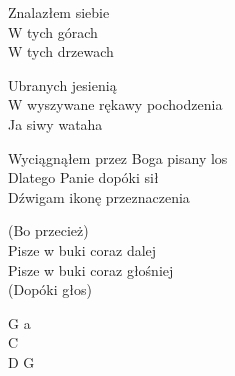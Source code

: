 \begin{text}
    Znalazłem siebie\\
    W tych górach\\
    W tych drzewach

    Ubranych jesienią\\
    W wyszywane rękawy  pochodzenia\\
    Ja siwy wataha

    Wyciągnąłem przez Boga pisany los\\
    Dlatego Panie dopóki sił\\
    Dźwigam ikonę przeznaczenia

    (Bo przecież)\\
    Pisze w buki coraz dalej\\
    Pisze w buki coraz głośniej\\
    (Dopóki głos)
\end{text}
\begin{chord}
    G a\\
    C\\
    D G
\end{chord}